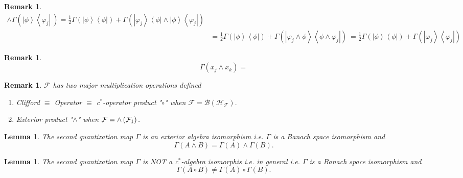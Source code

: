\documentclass[aps,preprint]{revtex4}%
\newtheorem{lemma}[theorem]{Lemma}
\newtheorem{remark}[theorem]{Remark}
\begin{document}
\begin{remark}
\begin{align}
\wedge\Gamma\left(  \left\vert \phi\right\rangle \left\langle \varphi
_{j}\right\vert \ \right)  =\frac{1}{2}\Gamma\left(  \left\vert \phi
\right\rangle \left\langle \phi\right\vert \right)  +\Gamma\left(  \left\vert
\varphi_{j}\right\rangle \left\langle \phi\right\vert \wedge\left\vert
\phi\right\rangle \left\langle \varphi_{j}\right\vert \right) \\
&  =\frac{1}{2}\Gamma\left(  \left\vert \phi\right\rangle \left\langle
\phi\right\vert \right)  +\Gamma\left(  \left\vert \varphi_{j}\wedge
\phi\right\rangle \left\langle \phi\wedge\varphi_{j}\right\vert \right)
\ =\frac{1}{2}\Gamma\left(  \left\vert \phi\right\rangle \left\langle
\phi\right\vert \right)  +\Gamma\left(  \left\vert \varphi_{j}\right\rangle
\left\langle \varphi_{j}\right\vert \right)
\end{align}

\end{remark}

\begin{remark}%
\begin{equation}
\Gamma\left(  x_{j}\wedge x_{k}\right)  =
\end{equation}

\end{remark}

\begin{remark}
$\mathcal{F}$ has two major multiplication operations defined

\begin{enumerate}
\item Clifford $\equiv$ Operator $\equiv$ c$^{\ast}$-operator product "$\circ
$" when $\mathcal{F=B}\left(  \mathcal{H}_{\mathcal{F}}\right)  .$

\item Exterior product "$\wedge$" when $\mathcal{F}={\LARGE \wedge}\left(
\mathcal{F}_{1}\right)  .$
\end{enumerate}
\end{remark}

\begin{lemma}
The second quantization map $\Gamma$ is an exterior algebra isomorphism i.e.
$\Gamma$ is a Banach space isomorphism and
\begin{equation}
\Gamma\left(  A\wedge B\right)  =\Gamma\left(  A\right)  \wedge\Gamma\left(
B\right)  .
\end{equation}

\end{lemma}

\begin{lemma}
The second quantization map $\Gamma$ is NOT a c$^{\ast}$-algebra isomorphis
i.e. in general i.e. $\Gamma$ is a Banach space isomorphism and
\begin{equation}
\Gamma\left(  A\circ B\right)  \neq\Gamma\left(  A\right)  \circ\Gamma\left(
B\right)  .
\end{equation}

\end{lemma}
\end{document}
